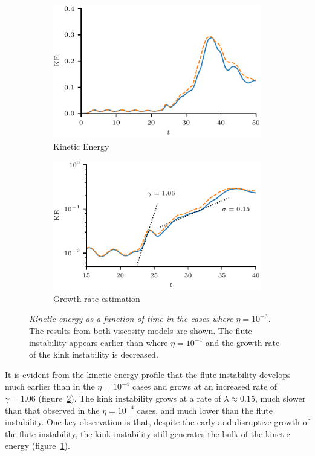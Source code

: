 \documentclass[fleqn,usenatbib]{mnras}
\newcommand{\mycaption}[2]{\caption[#1]{\emph{#1} #2}}
\begin{document}
\begin{figure}
  \centering
    \begin{subfigure}{0.49\textwidth}
      \includegraphics[width=\linewidth]{kinetic_energy-3.pdf}
      \caption{Kinetic Energy}
      \label{fig:kink_ke-3}
    \end{subfigure}
    \hfill
    \begin{subfigure}{0.49\textwidth}
      \includegraphics[width=\linewidth]{kinetic_energy_log-3.pdf}
      \caption{Growth rate estimation}
      \label{fig:kink_ke_log-3}
    \end{subfigure}
\mycaption{Kinetic energy as a function of time in the cases where $\eta=10^{-3}$.}{The results from both viscosity models are shown. The flute instability appears earlier than where $\eta=10^{-4}$ and the growth rate of the kink instability is decreased.}
\label{fig:kink_str8_ke-3}%
\end{figure}

It is evident from the kinetic energy profile that the flute instability develops much earlier than in the $\eta=10^{-4}$ cases and grows at an increased rate of $\gamma = 1.06$ (figure~\ref{fig:kink_ke_log-3}). The kink instability grows at a rate of $\lambda \approx 0.15$, much slower than that observed in the $\eta=10^{-4}$ cases, and much lower than the flute instability. One key observation is that, despite the early and disruptive growth of the flute instability, the kink instability still generates the bulk of the kinetic energy (figure~\ref{fig:kink_ke-3}).
\end{document}
